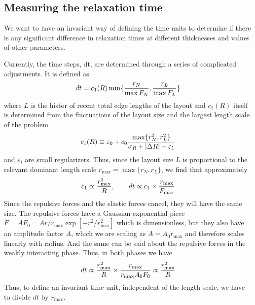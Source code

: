 \documentclass[nofootinbib,preprint,floatfix,titlepage,endfloats,superscriptaddress]{revtex4} %
\newcommand{\outNim}[1]{}
\begin{document}
\outNim{
\subsection{FDL bad}
Even with a reasonably small link thickness, the plain FDL puts nodes too close to each other and makes linking them very cumbersome. Of course, modern algorithms based on FDL modify it in order to avoid such node crossings. 
Our E-ELM algorithm with purely short-range forces between nodes naturally includes the exclusion volume around nodes and avoids nodes overlaps. 
}

\subsection{Measuring the relaxation time}
We want to have an invariant way of defining the time units to determine if there is any significant difference in relaxation times at different thicknesses and values of other parameters. 

Currently, the time steps, dt, are determined through a series of complicated adjustments. It is defined as 
$$dt = c_1( R) \min\{{r_N\over \max{F_N}},{r_L\over \max{F_L}}\} $$
where $L$ is the histor of recent total edge lengths of the layout and  $c_1(R)$ itself is determined from the fluctuations of the layout size and the largest length scale of the problem
$$ c_1(R) \equiv \varepsilon_0 + c_0 {\max\{r_N^2, r_L^2\}\over \sigma_R + |\Delta R|+\varepsilon_1}$$
and $\varepsilon_i$ are small regularizers. 
Thus, since the layout size $L$ is proportional to the relevant dominant length scale $r_{\max} = \max{\{r_N, r_L\}} $, we find that approximately
\[ c_1 \propto {r_{\max}^2\over R}, \qquad dt \propto c_1 \times {r_{\max} \over F_{\max}} \]
Since the repulsive forces and the elastic forces cancel, they will have the same size. The repulsive forces have a Gaussian exponential piece $ F = A F_0 = A r/r_{\max} \exp[-r^2/r^2_{\max}] $ which is dimensionless, but they also have an amplitude factor $A$, which we are scaling as $A = A_0 r_{\max}$ and therefore scales linearly with radius. And the same can be said about the repulsive forces in the weakly interacting phase. 
Thus, in both phases we have
$$ dt \propto {r_{\max}^2\over R} \times {r_{\max} \over r_{\max} A_0 F_0 } \propto {r_{\max}^2\over R} $$
Thus, to define an invariant time unit, independent of the length scale, we have to divide $dt$ by $r_{\max}$. 
\end{document}
